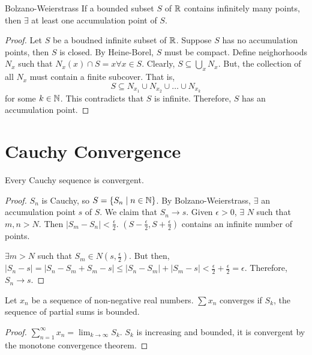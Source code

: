 \begin{theorem}{Bolzano-Weierstrass}{}
    If a bounded subset $S$ of $\mathbb{R}$ contains infinitely many points, then $\exists$ at least one accumulation point of $S$.
\end{theorem}
\begin{proof}
    Let $S$ be a boudned infinite subset of $\mathbb{R}$. Suppose $S$ has no accumulation points, then $S$ is closed. By Heine-Borel, $S$ must be compact. Define neighorhoods $N_x$ such that $N_x(x) \cap S = {x} \forall x \in S$. Clearly, $S \subseteq \bigcup_x N_x$. But, the collection of all $N_x$ must contain a finite subcover. That is, $$S \subseteq N_{x_1} \cup N_{x_2} \cup \ldots \cup N_{x_k}$$ for some $k \in \mathbb{N}$. This contradicts that $S$ is infinite. Therefore, $S$ has an accumulation point.
\end{proof}

\section{Cauchy Convergence}
\begin{theorem}{}{}
    Every Cauchy sequence is convergent.
\end{theorem}
\begin{proof}
    $S_n$ is Cauchy, so $S = \{S_n \mid n \in \mathbb{N}\}$. By Bolzano-Weierstrass, $\exists$ an accumulation point $s$ of $S$. We claim that $S_n \rightarrow s$. Given $\epsilon > 0$, $\exists$ $N$ such that $m, n > N$. Then $|S_m - S_n| < \frac{\epsilon}{2}$. $(S - \frac{\epsilon}{2}, S + \frac{\epsilon}{2})$ contains an infinite number of points. 
    
    $\exists m > N$ such that $S_m \in N(s, \frac{\epsilon}{2})$. But then, $|S_n - s| = |S_n - S_m + S_m - s| \leq |S_n - S_m| + |S_m - s| < \frac{\epsilon}{2} + \frac{\epsilon}{2} = \epsilon$. Therefore, $S_n \rightarrow s$.
\end{proof}

\begin{theorem}{}{}
    Let $x_n$ be a sequence of non-negative real numbers. $\sum x_n$ converges if $S_k$, the sequence of partial sums is bounded.
\end{theorem}
\begin{proof}
    $\sum_{n=1}^\infty x_n = \lim_{k \to \infty} S_k$. $S_k$ is increasing and bounded, it is convergent by the monotone convergence theorem.
\end{proof}